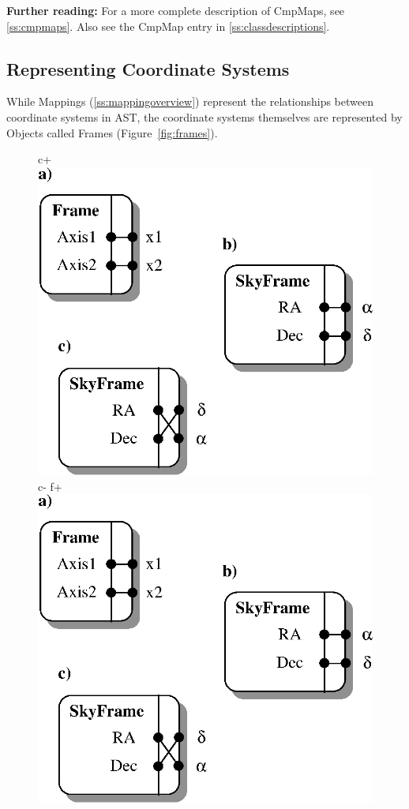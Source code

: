 \documentclass[twoside,11pt]{article}
\newenvironment{latexonly}{}{}
\newcommand{\appref}[1]{Appendix~\ref{#1}}
\newcommand{\secref}[1]{\S\ref{#1}}
\renewcommand{\appref}[1]{\ref{#1}}
\renewcommand{\secref}[1]{\ref{#1}}
\begin{document}
{\bf{Further reading:}} For a more complete description of CmpMaps,
see \secref{ss:cmpmaps}. Also see the CmpMap entry in
\appref{ss:classdescriptions}.

\subsection{Representing Coordinate Systems}

\begin{latexonly}
   While Mappings (\secref{ss:mappingoverview}) represent the
   relationships between coordinate systems in AST, the coordinate
   systems themselves are represented by Objects called Frames
   (Figure~\ref{fig:frames}).
   \begin{figure}
   \begin{center}
c+
   \includegraphics[scale=0.75]{sun211_figures/frames.eps}
c-
f+
   \includegraphics[scale=0.75]{sun210_figures/frames.eps}

\end{center}
\end{figure}
\end{latexonly}
\end{document}
